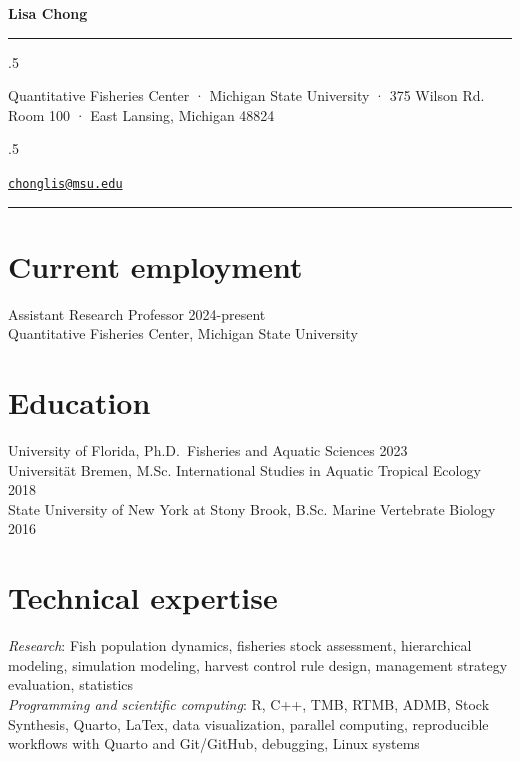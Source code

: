 \documentclass[
  11pt,
]
{article}
\begin{document}
\centerline{\huge \bf Lisa Chong}

\vspace{2 mm}

\hrule

\vspace{2 mm}


\moveleft.5\hoffset\centerline{Quantitative Fisheries Center · Michigan
State University · 375 Wilson Rd. Room 100 · East Lansing, Michigan
48824}
\moveleft.5\hoffset\centerline{ \faEnvelope \hspace{1 mm} \href{mailto:}{\tt chonglis@msu.edu} \hspace{1 mm}           }



\vspace{2 mm}

\hrule



\section{Current employment}\label{current-employment}

Assistant Research Professor \hfill 2024-present\\
Quantitative Fisheries Center, Michigan State University

\section{Education}\label{education}

University of Florida, Ph.D.~Fisheries and Aquatic Sciences
\hfill 2023\\
Universität Bremen, M.Sc. International Studies in Aquatic Tropical
Ecology \hfill 2018\\
State University of New York at Stony Brook, B.Sc. Marine Vertebrate
Biology \hfill 2016

\section{Technical expertise}\label{technical-expertise}

\emph{Research}: Fish population dynamics, fisheries stock assessment,
hierarchical modeling, simulation modeling, harvest control rule design,
management strategy evaluation, statistics\\
\emph{Programming and scientific computing}: R, C++, TMB, RTMB, ADMB,
Stock Synthesis, Quarto, LaTex, data visualization, parallel computing,
reproducible workflows with Quarto and Git/GitHub, debugging, Linux
systems
\end{document}
